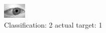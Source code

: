 \begin{figure}[h!]
\begin{center}
\includegraphics[width=0.60\columnwidth]{figures/ID2755_class_2_target_1.png}
\end{center}
\caption{ Classification: 2 actual target: 1}
\label{fig:ID2755_class_2_target_1}
\end{figure}
